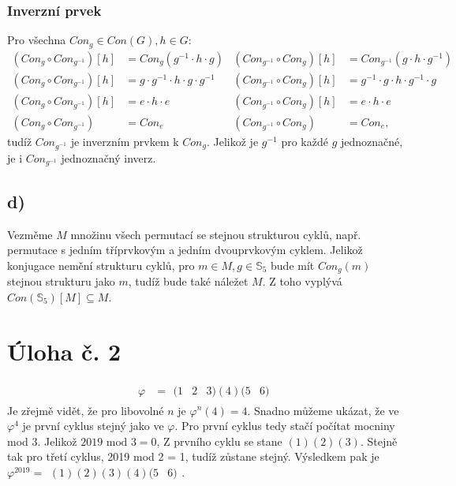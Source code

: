 \documentclass{scrartcl}
\begin{document}
    \subsubsection*{Inverzní prvek}
    Pro všechna $Con_g \in Con(G), h \in G$:
    \begin{align*}
        (Con_g \circ Con_{g^{-1}})[h] &= Con_g(g^{-1} \cdot h \cdot g) & (Con_{g^{-1}} \circ Con_g)[h] &= Con_{g^{-1}}(g \cdot h \cdot g^{-1}) \\
        (Con_g \circ Con_{g^{-1}})[h] &= g \cdot g^{-1} \cdot h \cdot g \cdot g^{-1} & (Con_{g^{-1}} \circ Con_g)[h] &= g^{-1} \cdot g \cdot h \cdot g^{-1} \cdot g \\
        (Con_g \circ Con_{g^{-1}})[h] &= e \cdot h \cdot e & (Con_{g^{-1}} \circ Con_g)[h] &= e \cdot h \cdot e \\
        (Con_g \circ Con_{g^{-1}}) &= Con_e & (Con_{g^{-1}} \circ Con_g) &= Con_e,
    \end{align*}
    tudíž $Con_{g^{-1}}$ je inverzním prvkem k $Con_g$. Jelikož je $g^{-1}$ pro každé $g$ jednoznačné, je i $Con_{g^{-1}}$ jednoznačný inverz.

    \subsection*{d)}
    Vezměme $M$ množinu všech permutací se stejnou strukturou cyklů, např. permutace s jedním tříprvkovým a jedním dvouprvkovým cyklem. Jelikož konjugace nemění strukturu cyklů, pro $m \in M, g \in \mathbb{S}_5$ bude mít $Con_g(m)$ stejnou strukturu jako $m$, tudíž bude také náležet $M$. Z toho vyplývá $Con(\mathbb{S}_5)[M] \subseteq M$.
    \section*{Úloha č. 2}
    \begin{align*}
        \varphi &= \begin{matrix}
            (1 & 2 & 3)(4)(5 & 6)
        \end{matrix}
    \end{align*}
    Je zřejmě vidět, že pro libovolné $n$ je $\varphi^n(4) = 4$. Snadno můžeme ukázat, že ve $\varphi^4$ je první cyklus stejný jako ve $\varphi$. Pro první cyklus tedy stačí počítat mocniny mod 3. Jelikož $2019 \text{ mod } 3 = 0$, Z prvního cyklu se stane $(1)(2)(3)$. Stejně tak pro třetí cyklus, 2019 mod 2 = 1, tudíž zůstane stejný. Výsledkem pak je $\varphi^{2019} = \begin{matrix}
        (1)(2)(3)(4)(5 & 6)
    \end{matrix}$.
\end{document}
